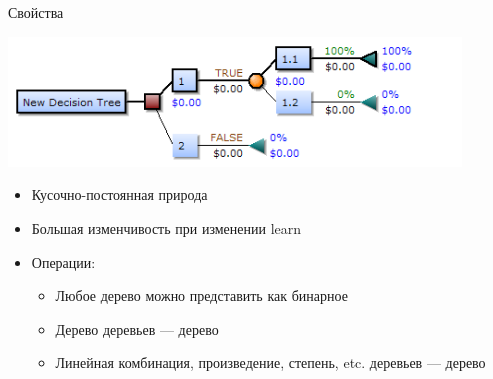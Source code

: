 \documentclass[14pt, fleqn, xcolor={dvipsnames, table}]{beamer}
\begin{document}
\begin{frame}{Свойства}
\begin{center}
\includegraphics[width=0.9\textwidth]{Decision-Tree-Elements.png}
\end{center}
\small
\begin{itemize}
  \item Кусочно-постоянная природа
  \item Большая изменчивость при изменении learn
  \item Операции:
  \begin{itemize}
    \item Любое дерево можно представить как бинарное
    \item Дерево деревьев --- дерево
    \item Линейная комбинация, произведение, степень, etc. деревьев --- дерево
  \end{itemize}
\end{itemize}
\end{frame}
\end{document}
